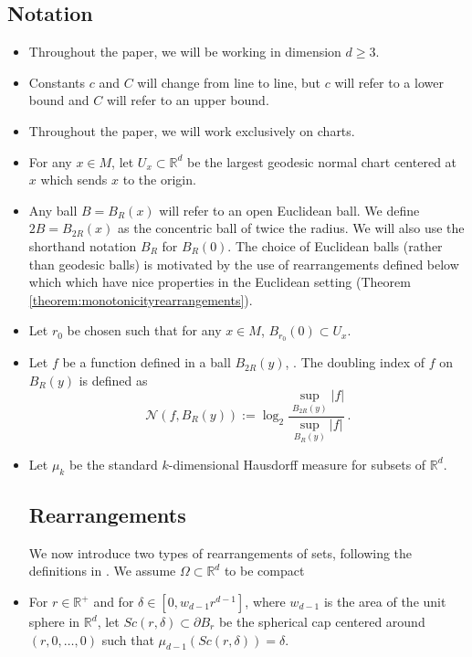 \documentclass{amsart}
\begin{document}
\subsection{Notation}\label{subsection:notation}
\begin{itemize}
\item Throughout the paper, we will be working in dimension $d \geq 3$.
\item Constants $c$ and $C$ will change from line to line, but $c$ will refer to a lower bound and $C$ will refer to an upper bound. 
    \item Throughout the paper, we will work exclusively on charts.

\item For any $x \in M$, let $U_x \subset \mathbb R^d$ be the largest geodesic normal chart centered at $x$ which sends $x$ to the origin.

    \item Any ball $B=B_R(x)$  will refer to an open Euclidean ball. We define $2B=B_{2R}(x)$ as the concentric ball of twice the radius. We will also use the shorthand notation $B_R$ for $B_R(0)$. 
    The choice of Euclidean balls (rather than geodesic balls) is motivated by the use of rearrangements defined below which which have nice properties in the Euclidean setting (Theorem \ref{theorem:monotonicityrearrangements}).

    

\item Let $r_0$ be chosen such that for any $x \in M$, $B_{r_0}(0) \subset U_x$.

\item Let $f$ be a function defined in a ball $B_{2R}(y)$, . The doubling index of $f$ on $B_R(y)$ is defined as
$$\mathcal{N}(f, B_R(y)):=\log_2\frac{\sup_{B_{2R}(y)} |f|}{\sup_{B_{R}(y)} |f|} \, .$$

    
    \item Let $\mu_k$ be the standard $k$-dimensional Hausdorff measure for subsets of $\mathbb R^d$.


    \subsection{Rearrangements}\label{subsection:rearrangements}
We now introduce two types of rearrangements of sets, following the definitions in \cite{Sarvas}. We assume $\Omega \subset \mathbb R^d$ to be compact 

\item 
For $r \in \mathbb R^+$ and for $\delta \in [0,w_{d-1}r^{d-1}]$, where $w_{d-1}$ is the area of the unit sphere in $\mathbb R^d$, let \linebreak $Sc(r,\delta) \subset \partial B_r$ be the spherical cap centered around $(r,0,\ldots,0)$ such that  $\mu_{d-1}(Sc(r,\delta)) = \delta$.


\end{itemize}
\end{document}
